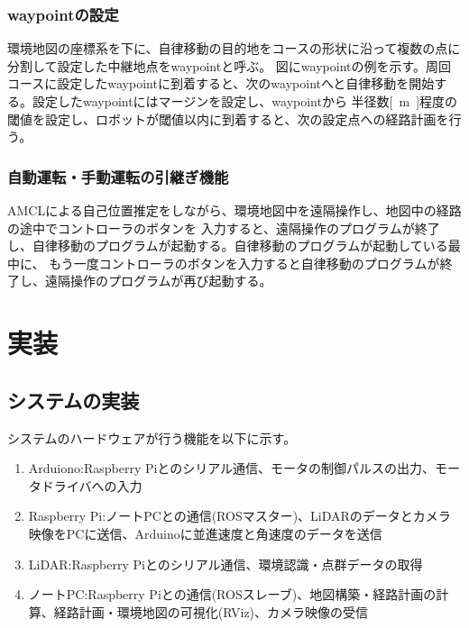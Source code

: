\subsubsection{waypointの設定}
環境地図の座標系を下に、自律移動の目的地をコースの形状に沿って複数の点に分割して設定した中継地点をwaypointと呼ぶ。
図にwaypointの例を示す。周回コースに設定したwaypointに到着すると、次のwaypointへと自律移動を開始する。設定したwaypointにはマージンを設定し、waypointから
半径数\si{[m]}程度の閾値を設定し、ロボットが閾値以内に到着すると、次の設定点への経路計画を行う。

\subsubsection{自動運転・手動運転の引継ぎ機能}
AMCLによる自己位置推定をしながら、環境地図中を遠隔操作し、地図中の経路の途中でコントローラのボタンを
入力すると、遠隔操作のプログラムが終了し、自律移動のプログラムが起動する。自律移動のプログラムが起動している最中に、
もう一度コントローラのボタンを入力すると自律移動のプログラムが終了し、遠隔操作のプログラムが再び起動する。

\section{実装}

\subsection{システムの実装}
システムのハードウェアが行う機能を以下に示す。

\begin{enumerate}
  \item Arduiono:Raspberry Piとのシリアル通信、モータの制御パルスの出力、モータドライバへの入力
  \item Raspberry Pi:ノートPCとの通信(ROSマスター)、LiDARのデータとカメラ映像をPCに送信、Arduinoに並進速度と角速度のデータを送信
  \item LiDAR:Raspberry Piとのシリアル通信、環境認識・点群データの取得
  \item ノートPC:Raspberry Piとの通信(ROSスレーブ)、地図構築・経路計画の計算、経路計画・環境地図の可視化(RViz)、カメラ映像の受信
\end{enumerate}

